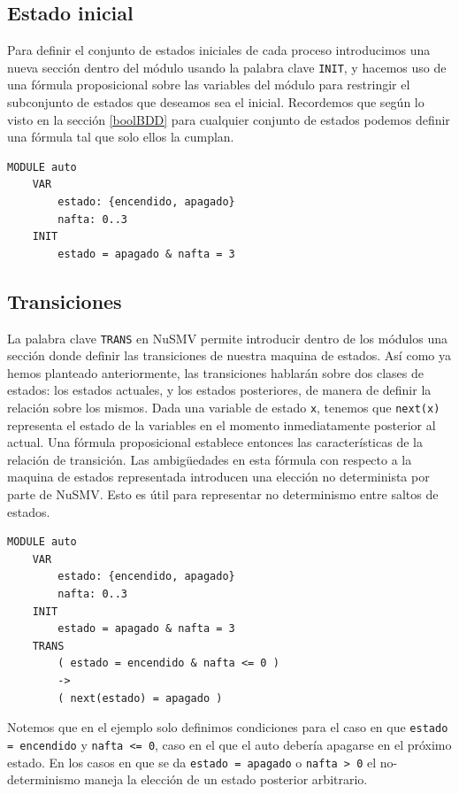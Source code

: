 \documentclass[pdftex,a4paper,12pt]{book}
\begin{document}
\subsection*{Estado inicial}

Para definir el conjunto de estados iniciales de cada proceso introducimos una nueva secci\'on dentro del m\'odulo usando la palabra clave \texttt{INIT}, y hacemos uso de una f\'ormula proposicional sobre las variables del m\'odulo para restringir el subconjunto de estados que deseamos sea el inicial. Recordemos que seg\'un lo visto en la secci\'on \ref{boolBDD} para cualquier conjunto de estados podemos definir una f\'ormula tal que solo ellos la cumplan.
\begin{verbatim}
MODULE auto
    VAR
        estado: {encendido, apagado}
        nafta: 0..3
    INIT
        estado = apagado & nafta = 3
\end{verbatim}


\subsection*{Transiciones}

La palabra clave \texttt{TRANS} en NuSMV permite introducir dentro de los m\'odulos una secci\'on donde definir las transiciones de nuestra maquina de estados. As\'i como ya hemos planteado anteriormente, las transiciones hablar\'an sobre dos clases de estados: los estados actuales, y los estados posteriores, de manera de definir la relaci\'on sobre los mismos. Dada una variable de estado \texttt{x}, tenemos que \texttt{next(x)} representa el estado de la variables en el momento inmediatamente posterior al actual. Una f\'ormula proposicional establece entonces las caracter\'isticas de la relaci\'on de transici\'on. Las ambigüedades en esta f\'ormula con respecto a la maquina de estados representada introducen una elecci\'on no determinista por parte de NuSMV. Esto es \'util para representar no determinismo entre saltos de estados.

\begin{verbatim}
MODULE auto
    VAR
        estado: {encendido, apagado}
        nafta: 0..3
    INIT
        estado = apagado & nafta = 3
    TRANS
        ( estado = encendido & nafta <= 0 ) 
        -> 
        ( next(estado) = apagado )

\end{verbatim}

Notemos que en el ejemplo solo definimos condiciones para el caso en que \texttt{estado = encendido} y \texttt{nafta <= 0}, caso en el que el auto deber\'ia apagarse en el pr\'oximo estado. En los casos en que se da \texttt{estado = apagado} o \texttt{nafta > 0} el no-determinismo maneja la elecci\'on de un estado posterior arbitrario.
\end{document}
